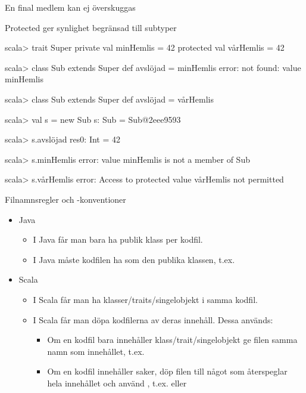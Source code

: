 \begin{Slide}{En final medlem kan ej överskuggas}
\vspace{-0.5em}
\end{Slide}


\begin{Slide}{Protected ger synlighet begränsad till subtyper}
\begin{REPL}
scala> trait Super { 
         private val minHemlis = 42
         protected val vårHemlis = 42
       }

scala> class Sub extends Super { def avslöjad = minHemlis } 
error: not found: value minHemlis

scala> class Sub extends Super { def avslöjad = vårHemlis } 
       
scala> val s = new Sub
s: Sub = Sub@2eee9593

scala> s.avslöjad
res0: Int = 42

scala> s.minHemlis
error: value minHemlis is not a member of Sub       

scala> s.vårHemlis
error: Access to protected value vårHemlis not permitted 
\end{REPL}
\end{Slide}


\begin{Slide}{Filnamnsregler och -konventioner}
\begin{itemize}
\item Java
\begin{itemize}
\item I Java får man bara ha  publik klass per kodfil.
\item I Java måste kodfilen ha  som den publika klassen, t.ex. 
\end{itemize}
\item Scala
\begin{itemize}
\item I Scala får man ha  klasser/traits/singelobjekt i samma kodfil.
\item I Scala får man döpa kodfilerna  av deras innehåll. \pause Dessa  används:
\begin{itemize}
\item Om en kodfil bara innehåller  klass/trait/singelobjekt ge filen samma namn som innehållet, t.ex.  
\item Om en kodfil innehåller  saker, döp filen till något som återspeglar hela innehållet och använd , t.ex.  eller  
\end{itemize}


\end{itemize}

\end{itemize}
\end{Slide}


